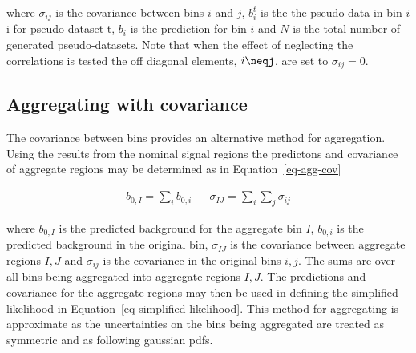 where $\sigma_{ij}$ is the covariance between bins $i$ and $j$, $b^t_i$ is the
the pseudo-data in bin $i$i for pseudo-dataset t, 
$b_i$ is the prediction for bin $i$ and $N$ is the total number of generated pseudo-datasets.
Note that when the effect of neglecting the correlations is tested the off diagonal 
elements, $i\neqj$, are set to $\sigma_{ij} = 0$.


\subsection{Aggregating with covariance}

The covariance between bins provides an alternative method for aggregation. 
Using the results from the nominal signal regions the predictons and covariance of aggregate regions
may be determined as in Equation~\ref{eq-agg-cov}

\begin{align}
b_{0,I} = \sum_i b_{0,i} && \sigma_{IJ}=\sum_i\sum_j\sigma_{ij}
\label{eq-agg-cov}
\end{align}

where $b_{0,I}$ is the predicted background for the aggregate bin $I$,
$b_{0,i}$ is the predicted background in the original bin, $\sigma_{IJ}$
is the covariance between aggregate regions $I,J$ and $\sigma_{ij}$ is
the covariance in the original bins $i,j$. The sums are over all
bins being aggregated into aggregate regions $I,J$. The predictions
and covariance for the aggregate regions may then be used in defining 
the simplified likelihood in Equation~\ref{eq-simplified-likelihood}.
This method for aggregating is approximate as the uncertainties
on the bins being aggregated are treated as symmetric and as following
gaussian pdfs.



